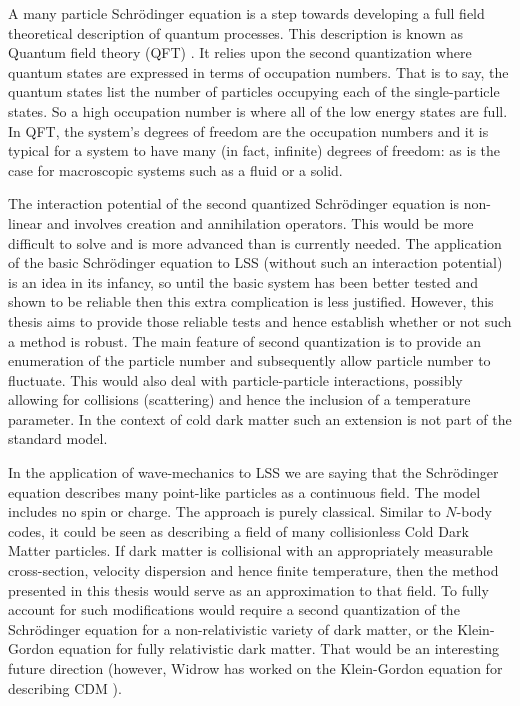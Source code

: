 A many particle Schr\"odinger equation is a step towards developing a full field theoretical description of quantum processes. This description is known as Quantum field theory (QFT) \citep{bib_qft}. It relies upon the second quantization where quantum states are expressed in terms of occupation numbers. That is to say, the quantum states list the number of particles occupying each of the single-particle states. So a high occupation number is where all of the low energy states are full. In QFT, the system's degrees of freedom are the occupation numbers and it is typical for a system to have many (in fact, infinite) degrees of freedom: as is the case for macroscopic systems such as a fluid or a solid.

The interaction potential of the second quantized Schr\"odinger equation is non-linear and involves creation and annihilation operators. This would be more difficult to solve and is more advanced than is currently needed. The application of the basic Schr\"odinger equation to LSS (without such an interaction potential) is an idea in its infancy, so until the basic system has been better tested and shown to be reliable then this extra complication is less justified. However, this thesis aims to provide those reliable tests and hence establish whether or not such a method is robust. The main feature of second quantization is to provide an enumeration of the particle number and subsequently allow particle number to fluctuate. This would also deal with particle-particle interactions, possibly allowing for collisions (scattering) and hence the inclusion of a temperature parameter. In the context of cold dark matter such an extension is not part of the standard model.

In the application of wave-mechanics to LSS we are saying that the Schr\"odinger equation describes many point-like particles as a continuous field. The model includes no spin or charge. The approach is purely classical. Similar to $N$-body codes, it could be seen as describing a field of many collisionless Cold Dark Matter particles. If dark matter is collisional with an appropriately measurable cross-section, velocity dispersion and hence finite temperature, then the method presented in this thesis would serve as an approximation to that field. To fully account for such modifications would require a second quantization of the Schr\"odinger equation for a non-relativistic variety of dark matter, or the Klein-Gordon equation for fully relativistic dark matter. That would be an interesting future direction (however, Widrow has worked on the Klein-Gordon equation for describing CDM \citep{bib_wid}).

